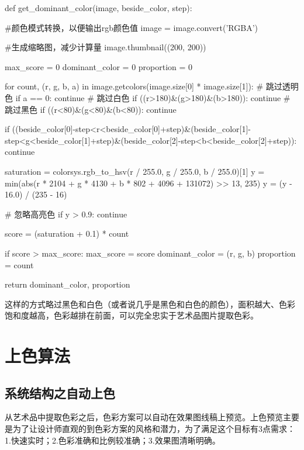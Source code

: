 \begin{python}
def get_dominant_color(image, beside_color, step):  
      
#颜色模式转换，以便输出rgb颜色值  
    image = image.convert('RGBA')  
      
#生成缩略图，减少计算量 
    image.thumbnail((200, 200))  
      
    max_score = 0 
    dominant_color = 0  
    proportion = 0
        
    for count, (r, g, b, a) in image.getcolors(image.size[0] * image.size[1]):  
        # 跳过透明色  
        if a == 0:  
            continue
        # 跳过白色    
        if ((r>180)&(g>180)&(b>180)):  
            continue
        # 跳过黑色   
        if ((r<80)&(g<80)&(b<80)):  
            continue 
            
        if ((beside_color[0]-step<r<beside_color[0]+step)&(beside_color[1]-step<g<beside_color[1]+step)&(beside_color[2]-step<b<beside_color[2]+step)):  
            continue
               
        saturation = colorsys.rgb_to_hsv(r / 255.0, g / 255.0, b / 255.0)[1]          
        y = min(abs(r * 2104 + g * 4130 + b * 802 + 4096 + 131072) >> 13, 235)         
        y = (y - 16.0) / (235 - 16)  
          
        # 忽略高亮色  
        if y > 0.9:  
            continue  

        score = (saturation + 0.1) * count  
          
        if score > max_score:  
            max_score = score  
            dominant_color = (r, g, b)  
            proportion = count
      
    return dominant_color, proportion  
\end{python}

这样的方式略过黑色和白色（或者说几乎是黑色和白色的颜色），面积越大、色彩饱和度越高，色彩越排在前面，可以完全忠实于艺术品图片提取色彩。

\section{上色算法}

\subsection{系统结构之自动上色}

从艺术品中提取色彩之后，色彩方案可以自动在效果图线稿上预览。上色预览主要是为了让设计师直观的到色彩方案的风格和潜力，为了满足这个目标有3点需求：1.快速实时；2.色彩准确和比例较准确；3.效果图清晰明确。

